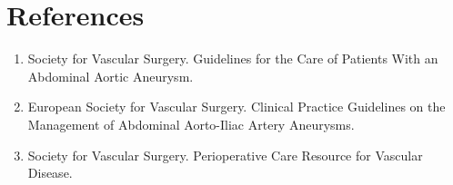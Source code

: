 \section*{References}
\begin{enumerate}
  \item Society for Vascular Surgery. Guidelines for the Care of Patients With an Abdominal Aortic Aneurysm.
  \item European Society for Vascular Surgery. Clinical Practice Guidelines on the Management of Abdominal Aorto-Iliac Artery Aneurysms.
  \item Society for Vascular Surgery. Perioperative Care Resource for Vascular Disease.
\end{enumerate}

\clearpage
